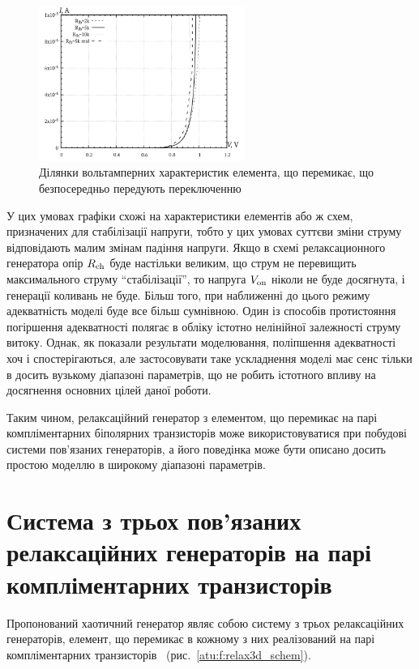 \begin{figure}[htb!]
  \centerline{\includegraphics[width=0.6\textwidth]{p/relax3d_sw_va_mini.png} }
\caption{Ділянки вольтамперних характеристик елемента, що перемикає, що безпосередньо передують переключенню}
\label{atu:f:relax3d_sw_vah_mini}
\end{figure}

У цих умовах графіки схожі на характеристики елементів або
ж схем, призначених для стабілізації напруги, тобто у цих
умовах суттєви зміни струму відповідають малим змінам падіння
напруги. Якщо в схемі релаксационного генератора опір
$ R _\mathrm{ch} $ буде настільки великим, що струм не перевищить
максимального струму ``стабілізації'', то напруга
$ V _\mathrm{on} $ ніколи не буде досягнута, і генерації коливань не
буде. Більш того, при наближенні до цього режиму адекватність
моделі буде все більш сумнівною. Один із способів протистояння
погіршення адекватності полягає в обліку істотно нелінійної
залежності струму витоку. Однак, як показали результати
моделювання, поліпшення адекватності хоч і спостерігаються,
але застосовувати таке ускладнення моделі має сенс тільки в
досить вузькому діапазоні параметрів, що не робить істотного
впливу на досягнення основних цілей даної роботи.

Таким чином, релаксаційний генератор з  елементом, що перемикає
на парі компліментарних біполярних транзисторів може
використовуватися при побудові системи пов'язаних генераторів,
а його поведінка може бути описано досить простою моделлю в
широкому діапазоні параметрів.



\section{Система з трьох пов'язаних релаксаційних генераторів на парі компліментарних транзисторів}
\label{atu:sec:relax3d}


Пропонований хаотичний генератор являє собою систему з трьох
релаксаційних генераторів, елемент, що перемикає в кожному з
них реалізований на парі компліментарних транзисторів~\cite{atu_st107}
(рис.~\ref{atu:f:relax3d_schem}).

